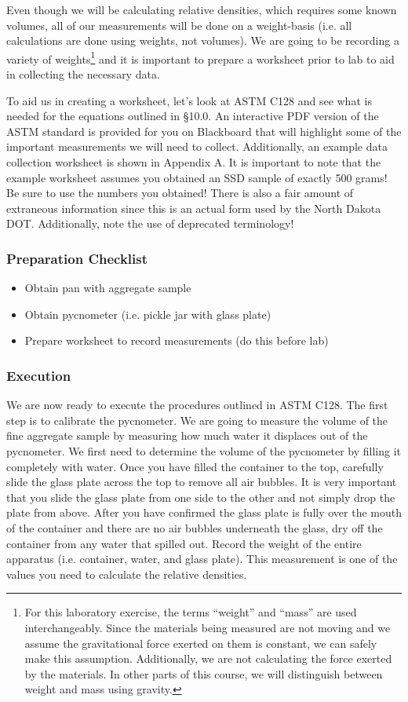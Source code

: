 \documentclass[12pt]{article}
\begin{document}
Even though we will be calculating relative densities, which requires some known volumes, all of our measurements will be done on a weight-basis (i.e. all calculations are done using weights, not volumes). We are going to be recording a variety of weights\footnote{For this laboratory exercise, the terms ``weight'' and ``mass'' are used interchangeably. Since the materials being measured are not moving and we assume the gravitational force exerted on them is constant, we can safely make this assumption. Additionally, we are not calculating the force exerted by the materials. In other parts of this course, we will distinguish between weight and mass using gravity.} and it is important to prepare a worksheet prior to lab to aid in collecting the necessary data.

To aid us in creating a worksheet, let's look at ASTM C128 and see what is needed for the equations outlined in \S 10.0. An interactive PDF version of the ASTM standard is provided for you on Blackboard that will highlight some of the important measurements we will need to collect. Additionally, an example data collection worksheet is shown in Appendix A. It is important to note that the example worksheet assumes you obtained an SSD sample of exactly 500 grams! Be sure to use the numbers you obtained! There is also a fair amount of extraneous information since this is an actual form used by the North Dakota DOT. Additionally, note the use of deprecated terminology!

\subsubsection*{Preparation Checklist}
\begin{itemize}
    \item Obtain pan with aggregate sample
    \item Obtain pycnometer (i.e. pickle jar with glass plate)
    \item Prepare worksheet to record measurements (do this before lab)
\end{itemize}

\subsubsection{Execution}
We are now ready to execute the procedures outlined in ASTM C128. The first step is to calibrate the pycnometer. We are going to measure the volume of the fine aggregate sample by measuring how much water it displaces out of the pycnometer. We first need to determine the volume of the pycnometer by filling it completely with water. Once you have filled the container to the top, carefully slide the glass plate across the top to remove all air bubbles. It is very important that you slide the glass plate from one side to the other and not simply drop the plate from above. After you have confirmed the glass plate is fully over the mouth of the container and there are no air bubbles underneath the glass, dry off the container from any water that spilled out. Record the weight of the entire apparatus (i.e. container, water, and glass plate). This measurement is one of the values you need to calculate the relative densities.
\end{document}
